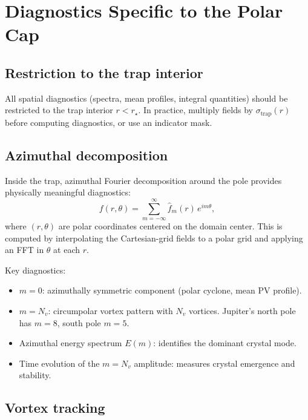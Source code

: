 \documentclass[11pt]{article}
\begin{document}
\section{Diagnostics Specific to the Polar Cap}
\label{sec:diagnostics}

\subsection{Restriction to the trap interior}

All spatial diagnostics (spectra, mean profiles, integral quantities) should be restricted to the trap interior $r < r_\star$. In practice, multiply fields by $\sigma_{\mathrm{trap}}(r)$ before computing diagnostics, or use an indicator mask.

\subsection{Azimuthal decomposition}

Inside the trap, azimuthal Fourier decomposition around the pole provides physically meaningful diagnostics:
\begin{equation}
f(r, \theta) = \sum_{m=-\infty}^{\infty} \hat{f}_m(r)\,e^{im\theta},
\end{equation}
where $(r, \theta)$ are polar coordinates centered on the domain center. This is computed by interpolating the Cartesian-grid fields to a polar grid and applying an FFT in $\theta$ at each $r$.

Key diagnostics:
\begin{itemize}[nosep]
\item $m = 0$: azimuthally symmetric component (polar cyclone, mean PV profile).
\item $m = N_v$: circumpolar vortex pattern with $N_v$ vortices. Jupiter's north pole has $m = 8$, south pole $m = 5$.
\item Azimuthal energy spectrum $E(m)$: identifies the dominant crystal mode.
\item Time evolution of the $m = N_v$ amplitude: measures crystal emergence and stability.
\end{itemize}

\subsection{Vortex tracking}
\end{document}
